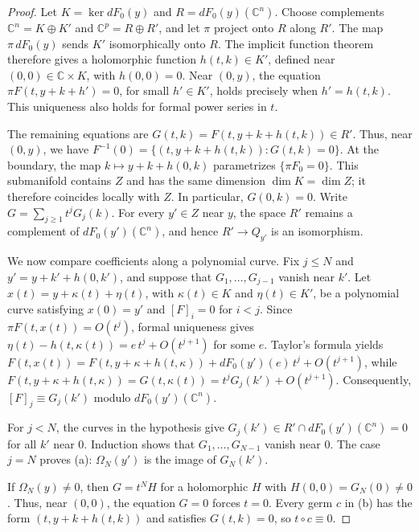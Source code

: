 \documentclass[Threeside,11pt]{article}
\theoremstyle{definition}
\theoremstyle{remark}
\numberwithin{equation}{section}
\newcommand{\C}{\mathbb C}\newcommand{\T}{\mathbb T}
\theoremstyle{remark}
\begin{document}
\begin{proof}
{Let $K=\ker dF_0(y)$ and $R=dF_0(y)(\C^n)$.
Choose complements $\C^n=K\oplus K'$ and $\C^p=R\oplus R'$, and let $\pi$ project onto $R$
along $R'$. The map $\pi\,dF_0(y)$ sends $K'$ isomorphically onto $R$.
The implicit function theorem therefore gives a holomorphic function $h(t,k)\in K'$,
defined near $(0,0)\in\C\times K$, with $h(0,0)=0$.
Near $(0,y)$, the equation $\pi F(t,y+k+h')=0$, for small $h'\in K'$, holds precisely when
$h'=h(t,k)$. This uniqueness also holds for formal power series in $t$.

The remaining equations are $G(t,k)=F(t,y+k+h(t,k))\in R'$.
Thus, near $(0,y)$, we have $F^{-1}(0)=\{(t,y+k+h(t,k)):G(t,k)=0\}$.
At the boundary, the map $k\mapsto y+k+h(0,k)$ parametrizes $\{\pi F_0=0\}$.
This submanifold contains $Z$ and has the same dimension $\dim K=\dim Z$;
it therefore coincides locally with $Z$. In particular, $G(0,k)=0$.
Write $G=\sum_{j\ge1}t^jG_j(k)$.
For every $y'\in Z$ near $y$, the space $R'$ remains a complement of $dF_0(y')(\C^n)$,
and hence $R'\to Q_{y'}$ is an isomorphism.

We now compare coefficients along a polynomial curve.
Fix $j\le N$ and $y'=y+k'+h(0,k')$, and suppose that $G_1,\dots,G_{j-1}$ vanish near $k'$.
Let $x(t)=y+\kappa(t)+\eta(t)$, with $\kappa(t)\in K$ and $\eta(t)\in K'$,
be a polynomial curve satisfying $x(0)=y'$ and $[F]_i=0$ for $i<j$.
Since $\pi F(t,x(t))=O(t^j)$, formal uniqueness gives
$\eta(t)-h(t,\kappa(t))=e\,t^j+O(t^{j+1})$ for some $e$.
Taylor's formula yields $F(t,x(t))=F(t,y+\kappa+h(t,\kappa))+dF_0(y')(e)\,t^j+O(t^{j+1})$,
while $F(t,y+\kappa+h(t,\kappa))=G(t,\kappa(t))=t^jG_j(k')+O(t^{j+1})$.
Consequently, $[F]_j\equiv G_j(k')$ modulo $dF_0(y')(\C^n)$.

For $j<N$, the curves in the hypothesis give $G_j(k')\in R'\cap dF_0(y')(\C^n)=0$
for all $k'$ near $0$. Induction shows that $G_1,\dots,G_{N-1}$ vanish near $0$.
The case $j=N$ proves (a): $\Omega_N(y')$ is the image of $G_N(k')$.

If $\Omega_N(y)\ne0$, then $G=t^NH$ for a holomorphic $H$ with $H(0,0)=G_N(0)\ne0$.
Thus, near $(0,0)$, the equation $G=0$ forces $t=0$.
Every germ $c$ in (b) has the form $(t,y+k+h(t,k))$ and satisfies $G(t,k)=0$,
so $t\circ c\equiv0$.}
\end{proof}
\end{document}
